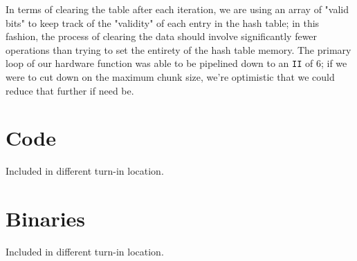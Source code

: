 \documentclass{article}
\begin{document}
\newline\newline
In terms of clearing the table after each iteration, we are using an array of "valid bits" to keep track of the "validity" of each entry in the hash table; in this fashion, the process of clearing the data should involve significantly fewer operations than trying to set the entirety of the hash table memory.
\newline\newline
The primary loop of our hardware function was able to be pipelined down to an \texttt{II} of $6$; if we were to cut down on the maximum chunk size, we're optimistic that we could reduce that further if need be.

\section{Code}

Included in different turn-in location.

\section{Binaries}

Included in different turn-in location.


\begin{appendices}
%
%
%


\end{appendices}
\end{document}
